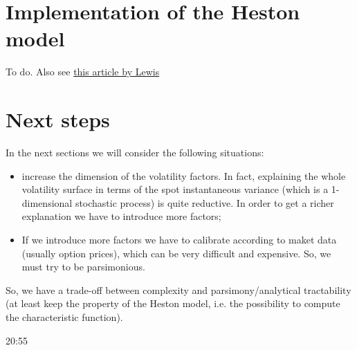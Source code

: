 \section{Implementation of the Heston model}
To do. Also see \href{http://www.optioncity.net/pubs/Ch2Excerpt.pdf}{this article by Lewis}

\section{Next steps}
In the next sections we will consider the following situations:
\begin{itemize}
    \item increase the dimension of the volatility factors. In fact, explaining the whole volatility surface in terms of the spot instantaneous variance (which is a 1-dimensional stochastic process) is quite reductive. In order to get a richer explanation we have to introduce more factors;
    \item If we introduce more factors we have to calibrate according to maket data (usually option prices), which can be very difficult and expensive. So, we must try to be parsimonious.
\end{itemize}
So, we have a trade-off between complexity and parsimony/analytical tractability (at least keep the property of the Heston model, i.e. the possibility to compute the characteristic function).

20:55
